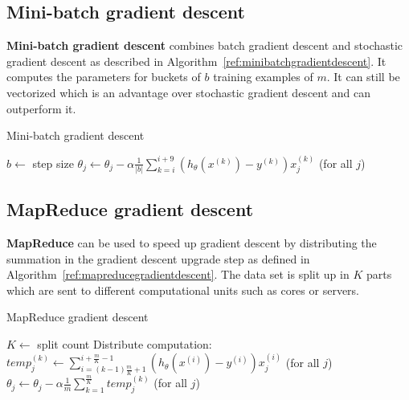 \documentclass{report}
\begin{document}
\subsection{Mini-batch gradient descent}
{\bf Mini-batch gradient descent} combines batch gradient descent and stochastic gradient descent as described in Algorithm~\ref{ref:minibatchgradientdescent}. It computes the parameters for buckets of $b$ training examples of $m$. It can still be vectorized which is an advantage over stochastic gradient descent and can outperform it.

\begin{algorithm}
\caption{Mini-batch gradient descent}
\label{ref:minibatchgradientdescent}
\begin{algorithmic}
\State $b\gets $ step size
\Repeat
{}
\State $\theta_j  \gets \theta_j - \alpha \frac{1}{\vert b\vert}\sum_{k=i}^{i+9} (h_\theta(x^{(k)})-y^{(k)})x_j^{(k)}$ (for all $j$)
\EndFor
{}
\end{algorithmic}
\end{algorithm}


\subsection{MapReduce gradient descent}
{\bf MapReduce} can be used to speed up gradient descent by distributing the summation in the gradient descent upgrade step as defined in Algorithm~\ref{ref:mapreducegradientdescent}. The data set is split up in $K$ parts which are sent to different computational units such as cores or servers.

\begin{algorithm}
\caption{MapReduce gradient descent}
\label{ref:mapreducegradientdescent}
\begin{algorithmic}
\State $K\gets $ split count
\Repeat
{}
\State Distribute computation: $temp_j^{(k)}\gets \sum_{i=(k-1)\frac{m}{K}+1}^{i+\frac{m}{K}-1}(h_\theta(x^{(i)})-y^{(i)})x_j^{(i)}$ (for all $j$)
\EndFor
\State $\theta_j  \gets \theta_j - \alpha \frac{1}{m}\sum_{k=1}^{\frac{m}{K}}temp_j^{(k)}$ (for all $j$)
\end{algorithmic}
\end{algorithm}
\end{document}
